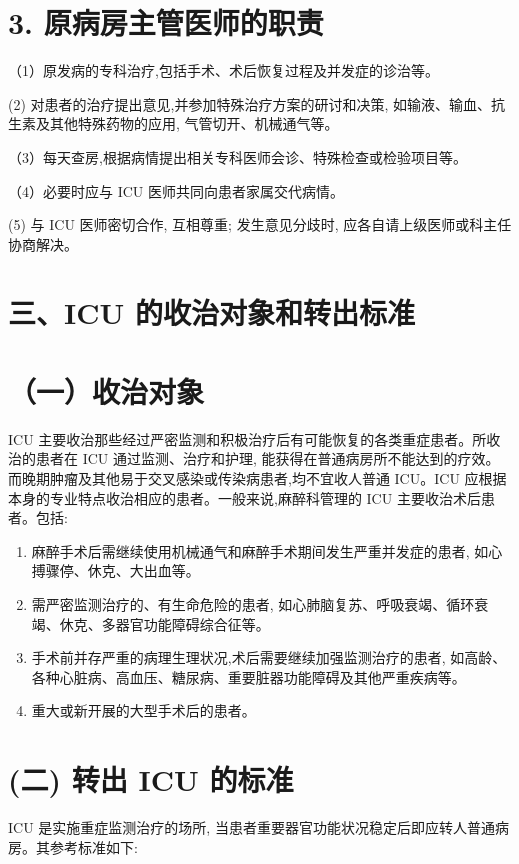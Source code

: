 \documentclass[10pt]{article}
\begin{document}
\section*{3. 原病房主管医师的职责}
（1）原发病的专科治疗,包括手术、术后恢复过程及并发症的诊治等。

(2) 对患者的治疗提出意见,并参加特殊治疗方案的研讨和决策, 如输液、输血、抗生素及其他特殊药物的应用, 气管切开、机械通气等。

（3）每天查房,根据病情提出相关专科医师会诊、特殊检查或检验项目等。

（4）必要时应与 ICU 医师共同向患者家属交代病情。

(5) 与 ICU 医师密切合作, 互相尊重; 发生意见分歧时, 应各自请上级医师或科主任协商解决。

\section*{三、ICU 的收治对象和转出标准}
\section*{（一）收治对象}
ICU 主要收治那些经过严密监测和积极治疗后有可能恢复的各类重症患者。所收治的患者在 ICU 通过监测、治疗和护理, 能获得在普通病房所不能达到的疗效。而晚期肿瘤及其他易于交叉感染或传染病患者,均不宜收人普通 ICU。ICU 应根据本身的专业特点收治相应的患者。一般来说,麻醉科管理的 ICU 主要收治术后患者。包括:

\begin{enumerate}
  \item 麻醉手术后需继续使用机械通气和麻醉手术期间发生严重并发症的患者, 如心搏骤停、休克、大出血等。

  \item 需严密监测治疗的、有生命危险的患者, 如心肺脑复苏、呼吸衰竭、循环衰竭、休克、多器官功能障碍综合征等。

  \item 手术前并存严重的病理生理状况,术后需要继续加强监测治疗的患者, 如高龄、各种心脏病、高血压、糖尿病、重要脏器功能障碍及其他严重疾病等。

  \item 重大或新开展的大型手术后的患者。

\end{enumerate}

\section*{(二) 转出 ICU 的标准}
ICU 是实施重症监测治疗的场所, 当患者重要器官功能状况稳定后即应转人普通病房。其参考标准如下:
\end{document}
